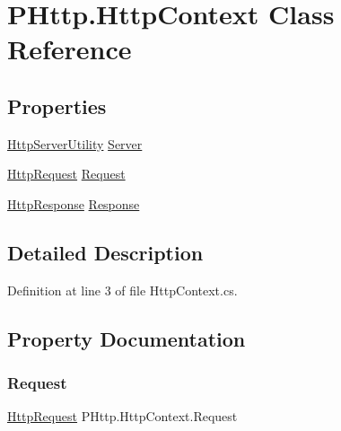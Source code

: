 \hypertarget{class_p_http_1_1_http_context}{}\section{P\+Http.\+Http\+Context Class Reference}
\label{class_p_http_1_1_http_context}
\subsection*{Properties}
\begin{DoxyCompactItemize}
\item 
\hyperlink{class_p_http_1_1_http_server_utility}{Http\+Server\+Utility} \hyperlink{class_p_http_1_1_http_context_a9296bc89f3b2af71642609f2d516a0fc}{Server}
\item 
\hyperlink{class_p_http_1_1_http_request}{Http\+Request} \hyperlink{class_p_http_1_1_http_context_abafd1e53c7bc714f1eb34f26fdd7c6fa}{Request}
\item 
\hyperlink{class_p_http_1_1_http_response}{Http\+Response} \hyperlink{class_p_http_1_1_http_context_a7c7a021a69279040a6229a0c40719083}{Response}
\end{DoxyCompactItemize}


\subsection{Detailed Description}


Definition at line 3 of file Http\+Context.\+cs.



\subsection{Property Documentation}
\mbox{\label{class_p_http_1_1_http_context_abafd1e53c7bc714f1eb34f26fdd7c6fa}} 
\subsubsection{\texorpdfstring{Request}{Request}}
{\footnotesize\ttfamily \hyperlink{class_p_http_1_1_http_request}{Http\+Request} P\+Http.\+Http\+Context.\+Request\hspace{0.3cm}{\ttfamily [get]}}



